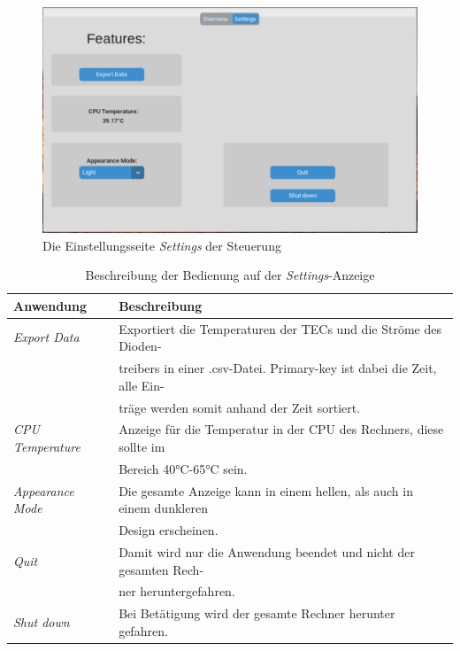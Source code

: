 \begin{figure}[H]
    \centering
    \includegraphics[scale=0.3, trim={1mm 1mm 1mm 2mm}, clip]{98_images/window_settings_large_02.PNG}
    \caption{Die Einstellungsseite \textit{Settings} der Steuerung}
    \label{fig:settings_sw}
\end{figure}

\begin{table}[H]
    \centering
    \begin{tabular}{l|l}
         \textbf{Anwendung}&        \textbf{Beschreibung}\\
         \hline
         \textit{Export Data}&      Exportiert die Temperaturen der TECs und die Ströme des Dioden-\\
         &                          treibers in einer .csv-Datei. Primary-key ist dabei die Zeit, alle Ein-\\
         &                          träge werden somit anhand der Zeit sortiert.\\
         \textit{CPU Temperature}&  Anzeige für die Temperatur in der CPU des Rechners, diese sollte im\\
         &                          Bereich 40°C-65°C sein.\\
         \textit{Appearance Mode}&  Die gesamte Anzeige kann in einem hellen, als auch in einem dunkleren\\
         &                          Design erscheinen.\\
         \textit{Quit}&             Damit wird nur die Anwendung beendet und nicht der gesamten Rech-\\
         &                          ner heruntergefahren.\\
         \textit{Shut down}&        Bei Betätigung wird der gesamte Rechner herunter gefahren.
    \end{tabular}
    \caption{Beschreibung der Bedienung auf der \textit{Settings}-Anzeige}
    \label{tab:settings_beschriebung_sw}
\end{table}

\nocite{*}